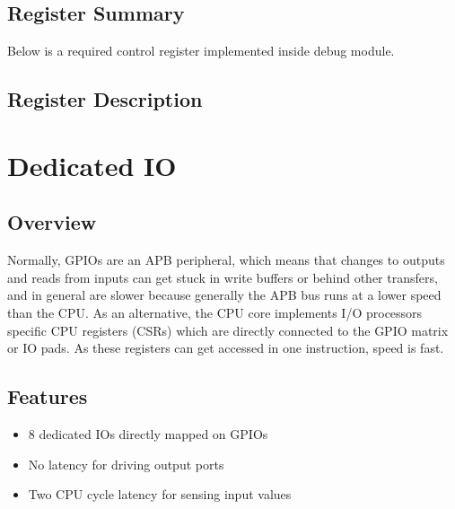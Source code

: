 \documentclass[main\_\_EN.tex]{subfiles}
\begin{document}

\clearpage
\hypertarget{riscvcpu-cti-reg-summ}{}
\subsection{Register Summary}
\label{sec:riscvcpu-cti-reg-summ}


Below is a required control register implemented inside debug module.




\subsection{Register Description}
\label{sec:riscvcpu-cti-reg-desc}



\clearpage
\section{Dedicated IO}
\label{sec:riscvcpu-fastio}

\subsection{Overview}
\label{sec:riscvcpu-fastio-overview}

Normally, GPIOs are an APB peripheral, which means that changes to outputs and reads from inputs can get stuck in write buffers or behind other transfers, and in general are slower because generally the APB bus runs at a lower speed than the CPU.
As an alternative, the CPU core implements I/O processors specific CPU registers (CSRs) which are directly connected to the GPIO matrix or IO pads. As these registers can get accessed in one instruction, speed is fast.

\subsection{Features}
\label{sec:riscvcpu-fastio-features}
 \begin{itemize}
    \item 8 dedicated IOs directly mapped on GPIOs
    \item No latency for driving output ports
    \item Two CPU cycle latency for sensing input values
\end{itemize}
\end{document}
